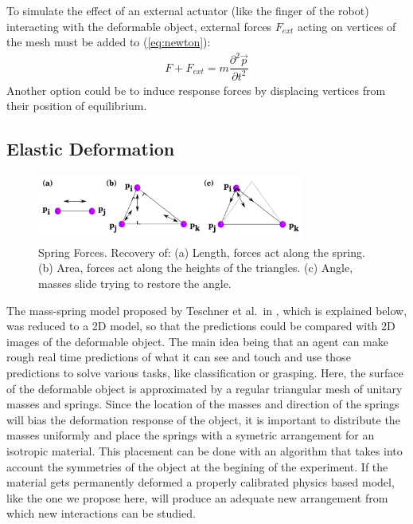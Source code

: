 \documentclass[journal]{IEEEtran}
\newcommand{\eref}[1]{(\ref{#1})}
\newcounter{algorithm}
\begin{document}
To simulate the effect of an external actuator (like the finger of the robot) interacting with the deformable object, external forces $F_{ext}$ acting on vertices of the mesh must be added to \eref{eq:newton}:
\begin{align}
F + F_{ext} = m \dfrac{\partial^2 \vec{p}}{\partial t^2}
\end{align}
Another option could be to induce response forces by displacing vertices from their position of equilibrium.


\label{sec:model}
\subsection{Elastic Deformation}

\begin{figure}[t]
\centering
\includegraphics[width=88mm]{arrio1}
\caption{Spring Forces. Recovery of: (a) Length, forces act along the spring.  (b) Area, forces act along the heights of the triangles. (c) Angle, masses slide trying to restore the angle.}
\label{fig:forces}
\end{figure}

The mass-spring model proposed by Teschner et al.\ in \cite{Teschner2004}, which is explained below, was reduced to a 2D model, so that the predictions could be compared with 2D images of the deformable object.  The main idea being that an agent can make rough real time predictions of what it can see and touch and use those predictions to solve various tasks, like classification or grasping.  Here, the surface of the deformable object is approximated by a regular triangular mesh of unitary masses and springs.  Since the location of the masses and direction of the springs will bias the deformation response of the object, it is important to distribute the masses uniformly and place the springs with a symetric arrangement for an isotropic material.  This placement can be done with an algorithm that takes into account the symmetries of the object at the begining of the experiment.  If the material gets permanently deformed a properly calibrated physics based model, like the one we propose here, will produce an adequate new arrangement from which new interactions can be studied.
\end{document}
